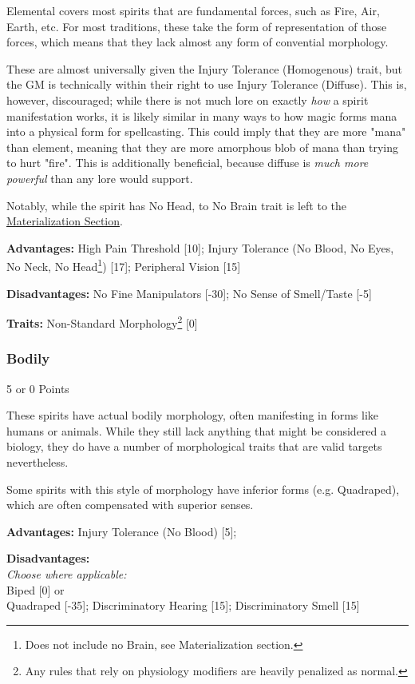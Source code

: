 \begin{multicols}{3}
	Elemental covers most spirits that are fundamental forces, such as Fire, Air, Earth, etc. For most traditions, these take the form of representation of those forces, which means that they lack almost any form of convential morphology.
	
	These are almost universally given the Injury Tolerance (Homogenous) trait, but the GM is technically within their right to use Injury Tolerance (Diffuse). This is, however, discouraged; while there is not much lore on exactly \textit{how} a spirit manifestation works, it is likely similar in many ways to how magic forms mana into a physical form for spellcasting. This could imply that they are more "mana" than element, meaning that they are more amorphous blob of mana than trying to hurt "fire". This is additionally beneficial, because diffuse is \textit{much more powerful} than any lore would support.
	
	Notably, while the spirit has No Head, to No Brain trait is left to the \hyperref[materialization]{Materialization Section}.
	
	\textbf{Advantages:} 
	High Pain Threshold [10]; Injury Tolerance (No Blood, No Eyes, No Neck, No Head\footnote{Does not include no Brain, see Materialization section.}) [17]; Peripheral Vision [15]
	
	\textbf{Disadvantages:}
	No Fine Manipulators [-30]; No Sense of Smell/Taste [-5]
	
	\textbf{Traits:}
	Non-Standard Morphology\footnote{Any rules that rely on physiology modifiers are heavily penalized as normal.} [0]
	
	\subsubsection*{Bodily}\label{bodily}
	\begin{flushright}
		5 or 0 Points
	\end{flushright}
	
	These spirits have actual bodily morphology, often manifesting in forms like humans or animals. While they still lack anything that might be considered a biology, they do have a number of morphological traits that are valid targets nevertheless.
	
	Some spirits with this style of morphology have inferior forms (e.g. Quadraped), which are often compensated with superior senses.
	
	\textbf{Advantages:} 
	Injury Tolerance (No Blood) [5];
	
	\textbf{Disadvantages:}
	\textit{\\Choose where applicable:\\}
	Biped [0] or\\
	Quadraped [-35]; Discriminatory Hearing [15]; Discriminatory Smell [15]\\
	

\end{multicols}
